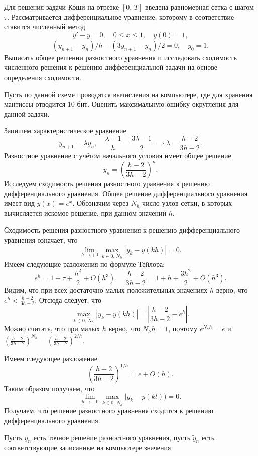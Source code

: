 \documentclass[a4paper]{article}
\begin{document}
\begin{hiProb}[9.9а]
	Для решения задачи Коши на отрезке $[0,\,T]$ введена
	равномерная сетка с шагом $\tau$. Рассматривается
	дифференциальное уравнение, которому в соответствие
	ставится численный метод
	\[
		y'-y=0,\quad 0\le x\le 1,\quad y(0)=1,
	\] 
	\[
		(y_{n+1}-y_n) /h - (3y_{n+1}-y_n) /2=0,\quad
		y_0=1
	.\] 
	Выписать общее решении разностного уравнения и
	исследовать сходимость численного решения к решению
	дифференциальной задачи на основе определения сходимости.

	Пусть по данной схеме проводятся вычисления на компьютере,
	где для хранения мантиссы отводится 10 бит. Оценить
	максимальную ошибку округления для данной задачи.
\end{hiProb}
\begin{sol}
Запишем характеристическое уравнение
\[
y_{n+1}=\lambda y_n,\quad \frac{\lambda-1}{h}= \frac{3\lambda-1}{2}\implies \lambda=\frac{h-2}{3 h-2}
.\] 
Разностное уравнение с учётом начального условия имеет общее решение
\[
	y_n=\left( \frac{h-2}{3h-2} \right) ^n
.\] 
Исследуем сходимость решения разностного уравнения к решению
дифференциального уравнения. Общее решение дифференциального
уравнения имеет вид $y(x)=e^x$. Обозначим через $N_h$ число
узлов сетки, в которых вычисляется искомое решение, при
данном значении $h$.

Сходимость решения разностного уравнения к решению дифференциального
уравнения означает, что
\[
\lim_{h \to +0} \max_{k \in  \overline{0,\,N_h}}|y_k-
y(kh)|=0
.\]
Имеем следующие разложения по формуле Тейлора:
\[
	e^{h}=1+\tau +\frac{h^2}{2}+O\left( h^3 \right) ,\quad \frac{h-2}{3h-2}=1+h+\frac{3h^2}{2}+
	O\left( h^3 \right) 
.\] 
Видим, что при всех достаточно малых положительных значениях
$h$ верно, что $e^{h}< \frac{h-2}{3h-2}$.
Отсюда следует, что
\[
	\max_{k \in  \overline{0,\, N_h}}|y_k-y(kh)|=\left| \frac{h-2}{3h-2}-e^h \right| 
.\] 
Можно считать, что при малых $h$ верно, что $N_h h=1$, поэтому
$e^{N_h h}=e$ и $\left(\frac{h-2}{3h-2}\right)^{N_h}=
\left( \frac{h-2}{3h-2} \right) ^{2 /h}$.

Имеем следующее разложение
\[
	\left( \frac{h-2}{3h-2} \right) ^{1 /h}=e+O(h)
.\] 
Таким образом получаем, что
\[
	\lim_{h \to +0}  \max_{k \in  \overline{0,\, N_h}}|y_k-y(kt))=0
.\] 
Получаем, что решение разностного уравнения сходится к решению
дифференциального уравнения.

Пусть $y_n$ есть точное решение разностного уравнения, пусть
$\tilde{y}_n$ есть соответствующие записанные на компьютере
значения.


\end{sol}
\end{document}
